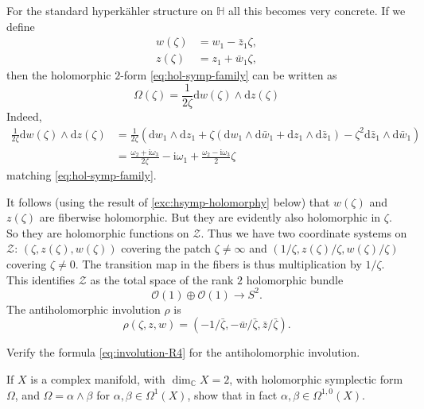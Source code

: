 \documentclass[12pt,letterpaper,reqno]{article}
\numberwithin{equation}{section}
\newcommand{\cZ}{\ensuremath{\mathcal Z}}
\newcommand{\cO}{\ensuremath{\mathcal O}}
\newcommand{\R}{\ensuremath{\mathbb R}}
\newcommand{\C}{\ensuremath{\mathbb C}}
\newcommand{\bbH}{\ensuremath{\mathbb H}}
\newcommand{\hk}{hyperk\"ahler\xspace}
\newcommand{\I}{{\mathrm i}}
\newcommand{\de}{\mathrm{d}}
\begin{document}
\begin{example}[Twistor space of $\R^4$] \label{exa:R4-twistor-space}
For the standard \hk structure on $\bbH$ all this becomes very 
concrete. 
If we define
\begin{align}
  w(\zeta) &= w_1 - \bar{z}_1 \zeta, \\
  z(\zeta) &= z_1 + \bar{w}_1 \zeta,
\end{align}
then the holomorphic $2$-form \eqref{eq:hol-symp-family}
can be written as
\begin{equation}
  \Omega(\zeta) = \frac{1}{2\zeta} \de w(\zeta) \wedge \de z(\zeta)
\end{equation}
Indeed,
\begin{align}
  \frac{1}{2\zeta} \de w(\zeta) \wedge \de z(\zeta) &= \frac{1}{2\zeta} (\de w_1 \wedge \de z_1 + \zeta (\de w_1 \wedge \de \bar{w}_1 + \de z_1 \wedge \de \bar{z}_1) - \zeta^2 \de \bar{z}_1 \wedge \de \bar{w}_1) \\
  &= \frac{\omega_2 + \I \omega_3}{2\zeta} - \I\omega_1 + \frac{\omega_2 - \I \omega_3}{2} \zeta
\end{align}
matching \eqref{eq:hol-symp-family}.

It follows (using the result of \autoref{exc:hsymp-holomorphy} below)
that $w(\zeta)$ and $z(\zeta)$ are fiberwise holomorphic.
But they are evidently also holomorphic in $\zeta$. So they are 
holomorphic functions on $\cZ$.
Thus we have two coordinate systems on $\cZ$:
$(\zeta, z(\zeta), w(\zeta))$
covering the patch $\zeta \neq \infty$ and $(1/\zeta, z(\zeta)/\zeta, w(\zeta)/\zeta)$ covering $\zeta \neq 0$. The transition map 
in the fibers is thus multiplication by $1/\zeta$.
This identifies
$\cZ$ as the total space of the rank $2$ holomorphic bundle
\begin{equation}
  \cO(1) \oplus \cO(1) \to S^2.
\end{equation}
The antiholomorphic involution $\rho$ is
\begin{equation} \label{eq:involution-R4}
  \rho(\zeta, z, w) = (-1/\bar\zeta, -\bar w / \bar\zeta, \bar z / \bar \zeta).
\end{equation}
\end{example}

\begin{exercise}
Verify the formula \eqref{eq:involution-R4} for the antiholomorphic
involution.
\end{exercise}

\begin{exercise} \label{exc:hsymp-holomorphy}
If $X$ is a complex manifold, with $\dim_\C X = 2$, with holomorphic symplectic form
$\Omega$, and $\Omega = \alpha \wedge \beta$ for $\alpha,\beta \in \Omega^1(X)$, 
show that in fact $\alpha, \beta \in \Omega^{1,0}(X)$.
\end{exercise}
\end{document}
